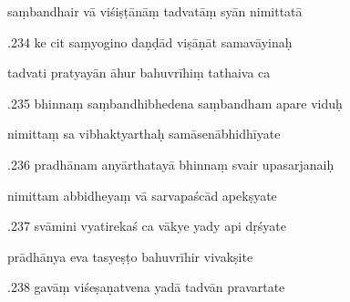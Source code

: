 \documentclass[article,12pt,a4paper]{memoir}%
\newcounter{parCount}
\begin{document}
	  
	  \pstart \leavevmode%
	saṃbandhair vā viśiṣṭānāṃ tadvatāṃ syān nimittatā 
	{}
	\pend%
      

	  
	  \pstart {}.234 ke cit saṃyogino daṇḍād viṣāṇāt samavāyinaḥ 
	{}
	\pend%
      

	  
	  \pstart \leavevmode%
	tadvati pratyayān āhur bahuvrīhiṃ tathaiva ca 
	{}
	\pend%
      

	  
	  \pstart {}.235 bhinnaṃ saṃbandhibhedena saṃbandham apare viduḥ 
	{}
	\pend%
      

	  
	  \pstart \leavevmode%
	nimittaṃ sa vibhaktyarthaḥ samāsenābhidhīyate 
	{}
	\pend%
      

	  
	  \pstart {}.236 pradhānam anyārthatayā bhinnaṃ svair upasarjanaiḥ 
	{}
	\pend%
      

	  
	  \pstart \leavevmode%
	nimittam abbidheyaṃ vā sarvapaścād apekṣyate 
	{}
	\pend%
      

	  
	  \pstart {}.237 svāmini vyatirekaś ca vākye yady api dṛśyate 
	{}
	\pend%
      

	  
	  \pstart \leavevmode%
	prādhānya eva tasyeṣṭo bahuvrīhir vivakṣite 
	{}
	\pend%
      

	  
	  \pstart {}.238 gavāṃ viśeṣaṇatvena yadā tadvān pravartate 
	{}
	\pend%
      
\end{document}
